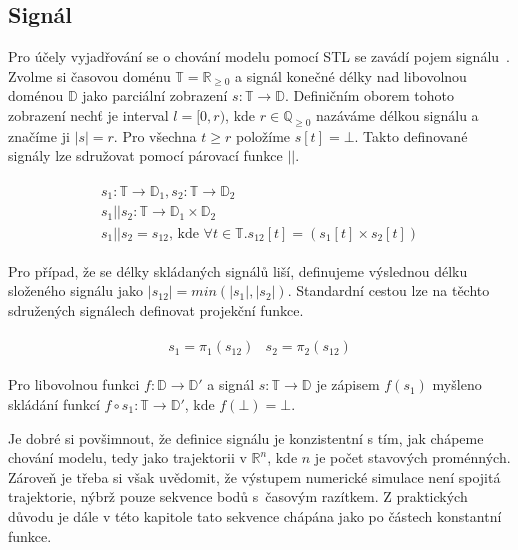 \subsection{Signál}
Pro účely vyjadřování se o chování modelu pomocí STL se zavádí pojem signálu~\cite{maler2004}.
Zvolme si časovou doménu $\mathbb{T} = \mathbb{R}_{\geq 0}$ a signál konečné délky
nad libovolnou doménou $\mathbb{D}$ jako parciální zobrazení $s: \mathbb{T} \rightarrow \mathbb{D}$.
Definičním oborem tohoto zobrazení nechť je interval $l = [0, r)$, kde $r \in \mathbb{Q}_{\geq0}$ nazáváme
délkou signálu a značíme ji $|s| = r$. Pro všechna $t \geq r$ položíme $s[t] = \bot$. Takto definované
signály lze sdružovat pomocí párovací funkce $||$.

\begin{align}\label{eq:signals:pairing}
\begin{array}{ll}
s_1: \mathbb{T} \rightarrow \mathbb{D}_1, s_2: \mathbb{T} \rightarrow \mathbb{D}_2	\\
s_1 || s_2: \mathbb{T} \rightarrow \mathbb{D}_1 \times\mathbb{D}_2		\\
s_1 || s_2= s_{12}\textrm{, kde }\forall t\in\mathbb{T}. s_{12}[t] = (s_1[t] \times s_2[t])
\end{array}
\end{align}

Pro případ, že se délky skládaných signálů liší, definujeme výslednou délku složeného
signálu jako $|s_{12}| = min(|s_1|, |s_2|)$. Standardní cestou lze na těchto sdružených
signálech definovat projekční funkce.

\begin{align}\label{eq:signals:pairing}
\begin{array}{ll}
s_1 = \pi_1(s_{12})		& s_2 = \pi_2(s_{12})
\end{array}
\end{align}

Pro libovolnou funkci $f: \mathbb{D} \rightarrow \mathbb{D}'$ a signál $s: \mathbb{T} \rightarrow \mathbb{D}$ je zápisem $f(s_1)$ myšleno
skládání funkcí $f \circ s_1 : \mathbb{T} \rightarrow \mathbb{D}'$, kde $f(\bot) = \bot$.

Je dobré si povšimnout, že definice signálu je konzistentní s tím, jak chápeme chování modelu,
tedy jako trajektorii v $\mathbb{R}^n$, kde $n$ je počet sta\-vo\-vých proménných. Zároveň
je třeba si však uvědomit, že výstupem numerické simulace není spojitá trajektorie, nýbrž pouze
sekvence bodů s~ča\-so\-vým razítkem. Z praktických důvodu je dále v této kapitole tato sekvence
chá\-pá\-na jako po částech konstantní funkce.

